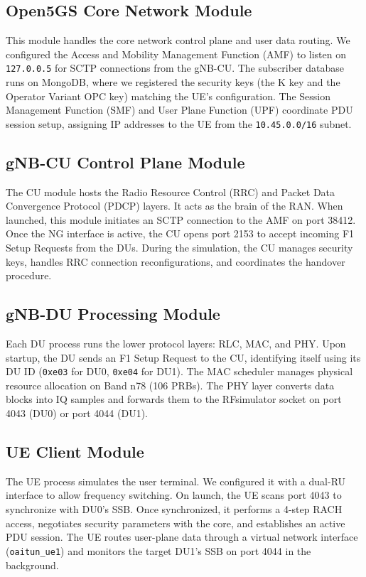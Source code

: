 \subsection{Open5GS Core Network Module}
This module handles the core network control plane and user data routing. We configured the Access and Mobility Management Function (AMF) to listen on \texttt{127.0.0.5} for SCTP connections from the gNB-CU. The subscriber database runs on MongoDB, where we registered the security keys (the K key and the Operator Variant OPC key) matching the UE's configuration. The Session Management Function (SMF) and User Plane Function (UPF) coordinate PDU session setup, assigning IP addresses to the UE from the \texttt{10.45.0.0/16} subnet.

\subsection{gNB-CU Control Plane Module}
The CU module hosts the Radio Resource Control (RRC) and Packet Data Convergence Protocol (PDCP) layers. It acts as the brain of the RAN. When launched, this module initiates an SCTP connection to the AMF on port 38412. Once the NG interface is active, the CU opens port 2153 to accept incoming F1 Setup Requests from the DUs. During the simulation, the CU manages security keys, handles RRC connection reconfigurations, and coordinates the handover procedure.

\subsection{gNB-DU Processing Module}
Each DU process runs the lower protocol layers: RLC, MAC, and PHY. Upon startup, the DU sends an F1 Setup Request to the CU, identifying itself using its DU ID (\texttt{0xe03} for DU0, \texttt{0xe04} for DU1). The MAC scheduler manages physical resource allocation on Band n78 (106 PRBs). The PHY layer converts data blocks into IQ samples and forwards them to the RFsimulator socket on port 4043 (DU0) or port 4044 (DU1).

\subsection{UE Client Module}
The UE process simulates the user terminal. We configured it with a dual-RU interface to allow frequency switching. On launch, the UE scans port 4043 to synchronize with DU0's SSB. Once synchronized, it performs a 4-step RACH access, negotiates security parameters with the core, and establishes an active PDU session. The UE routes user-plane data through a virtual network interface (\texttt{oaitun\_ue1}) and monitors the target DU1's SSB on port 4044 in the background.

